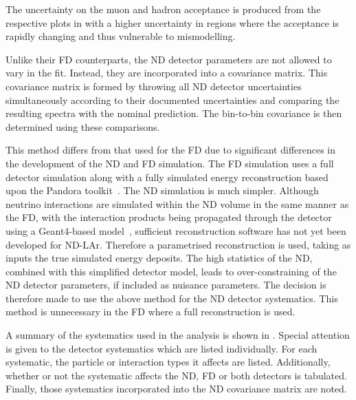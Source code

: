 The uncertainty on the muon and hadron acceptance is produced from the respective plots in  with a higher uncertainty in regions where the acceptance is rapidly changing and thus vulnerable to mismodelling.

Unlike their FD counterparts, the ND detector parameters are not allowed to vary in the fit.
Instead, they are incorporated into a covariance matrix.
This covariance matrix is formed by throwing all ND detector uncertainties simultaneously according to their documented uncertainties and comparing the resulting spectra with the nominal prediction.
The bin-to-bin covariance is then determined using these comparisons.

This method differs from that used for the FD due to significant differences in the development of the ND and FD simulation.
The FD simulation uses a full detector simulation along with a fully simulated energy reconstruction based upon the Pandora toolkit~\cite{pandora}.
The ND simulation is much simpler. 
Although neutrino interactions are simulated within the ND volume in the same manner as the FD, with the interaction products being propagated through the detector using a Geant4-based model~\cite{geant}, sufficient reconstruction software has not yet been developed for ND-LAr.
Therefore a parametrised reconstruction is used, taking as inputs the true simulated energy deposits.
The high statistics of the ND, combined with this simplified detector model, leads to over-constraining of the ND detector parameters, if included as nuisance parameters.
The decision is therefore made to use the above method for the ND detector systematics.
This method is unnecessary in the FD where a full reconstruction is used.

A summary of the systematics used in the analysis is shown in .
Special attention is given to the detector systematics which are listed individually.
For each systematic, the particle or interaction types it affects are listed.
Additionally, whether or not the systematic affects the ND, FD or both detectors is tabulated.
Finally, those systematics incorporated into the ND covariance matrix are noted.

